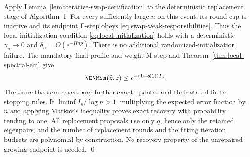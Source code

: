 Apply Lemma~\ref{lem:iterative-swap-certification} to the deterministic
replacement stage of Algorithm~1. For every sufficiently large $n$ on
this event, its round cap is inactive and its endpoint E-step obeys
\eqref{eq:swap-weak-responsibilities}. Thus the local initialization
condition \eqref{eq:local-initialization} holds with a deterministic
$\gamma_n\to0$ and $\delta_n=O(e^{-Hnp})$.
There is no additional randomized-initialization failure. The mandatory
final profile and weight M-step and
Theorem~\ref{thm:local-spectral-em} give
\[
 \E\Mis(\widehat z,z)\le e^{-(1+o(1))I_n}.
\]
The same theorem covers any further exact updates and their stated
finite stopping rules. If $\liminf I_n/\log n>1$, multiplying the
expected error fraction by $n$ and applying Markov's inequality proves
exact recovery with probability tending to one. All replacement
proposals use only $q$, hence only the retained eigenpairs, and the
number of replacement rounds and the fitting iteration budgets are
polynomial by construction. No recovery property of the unrepaired
growing endpoint is needed. \qed
